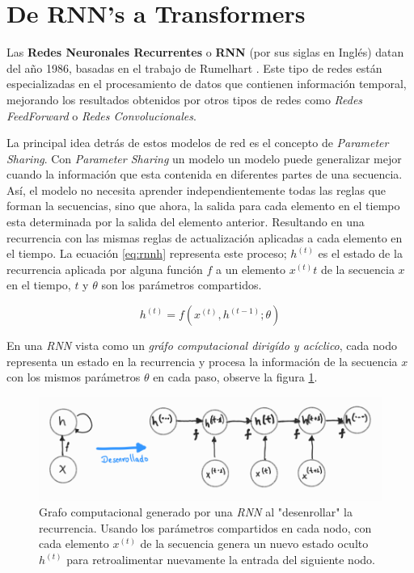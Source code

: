 \section{De RNN's a Transformers}

Las \textbf{Redes Neuronales Recurrentes} o \textbf{RNN} (por sus siglas en Inglés) datan del año
1986, basadas en el trabajo de Rumelhart \cite{Rumelhart}. Este tipo de redes están especializadas
en el procesamiento de datos que contienen información temporal, mejorando los resultados obtenidos
por otros tipos de redes como \textit{Redes FeedForward} o \textit{Redes Convolucionales}.

La principal idea detrás de estos modelos de red es el concepto de \textit{Parameter Sharing}.
Con \textit{Parameter Sharing} un modelo un modelo puede generalizar mejor cuando la información
que esta contenida en diferentes partes de una secuencia. Así, el modelo no necesita aprender
independientemente todas las reglas que forman la secuencias, sino que ahora, la salida para cada
elemento en el tiempo esta determinada por la salida del elemento anterior. Resultando en una
recurrencia con las mismas reglas de actualización aplicadas a cada elemento en el tiempo.
La ecuación \ref{eq:rnnh} representa este proceso; $h^{(t)}$ es el estado de la recurrencia aplicada
por alguna función $f$ a un elemento $x^{(t)}t$ de la secuencia $x$ en el tiempo, $t$ y $\theta$ son
los parámetros compartidos.

\begin{equation}
    h^{(t)} = f(x^{(t)}, h^{(t-1)}; \theta)
    \label{eq:rnnh}
\end{equation}

En una \textit{RNN} vista como un \textit{gráfo computacional dirigído y acíclico}, cada nodo
representa un estado en la recurrencia y procesa la información de la secuencia $x$ con los mismos
parámetros $\theta$ en cada paso, observe la figura \ref{fig:rnn_cg}.

\begin{figure}[!ht]
\centering
\includegraphics[width=.8\textwidth]{Chapters/1. Transformer/Figures/rnn/rnn_cgraph.png}
\caption[RNN - Grafo Computacional]{Grafo computacional generado por una \textit{RNN} al "desenrollar" la
recurrencia. Usando los parámetros compartidos en cada nodo, con cada elemento $x^{(t)}$ de la
secuencia genera un nuevo estado oculto $h^{(t)}$ para retroalimentar nuevamente la entrada del
siguiente nodo.}
\label{fig:rnn_cg}
\end{figure}

